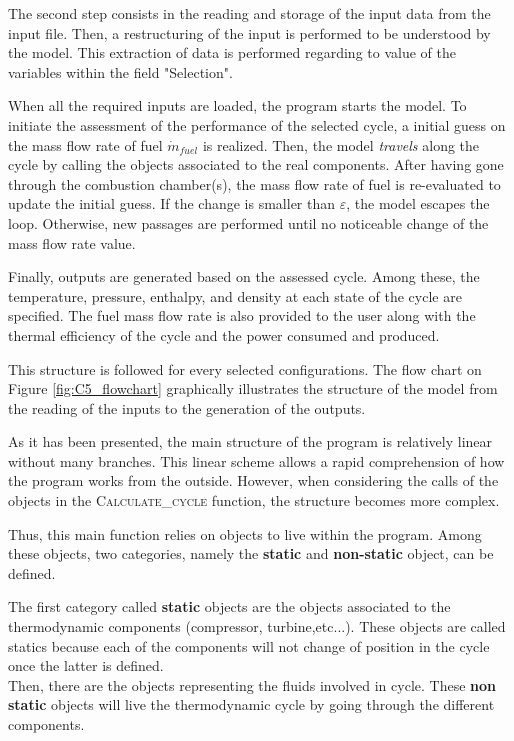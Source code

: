 The second step consists in the reading and storage of the input data from the input file. Then, a restructuring of the input is performed to be understood by the model. This extraction of data is performed regarding to value of the variables within the field "Selection".

When all the required inputs are loaded, the program starts the model. To initiate the assessment of the performance of the selected cycle, a initial guess on the mass flow rate of fuel $\dot{m}_{fuel}$ is realized. Then, the model \textit{travels} along the cycle by calling the objects associated to the real components. 
After having gone through the combustion chamber(s), the mass flow rate of fuel is re-evaluated to update the initial guess. If the change is smaller than $\varepsilon$, the model escapes the loop. Otherwise, new passages are performed until no noticeable change of the mass flow rate value.
   
Finally, outputs are generated based on the assessed cycle. Among these, the temperature, pressure, enthalpy, and density at each state of the cycle are specified. The fuel mass flow rate is also provided to the user along with the thermal efficiency of the cycle and the power consumed and produced. 

This structure is followed for every selected configurations. The flow chart on Figure \ref{fig:C5_flowchart} graphically illustrates the structure of the model from the reading of the inputs to the generation of the outputs.\\ \newpage

As it has been presented, the main structure of the program is relatively linear without many branches. This linear scheme allows a rapid comprehension of how the program works from the outside. However, when considering the calls of the objects in the \textsc{Calculate\_cycle} function, the structure becomes more complex. 

Thus, this main function relies on objects to live within the program.  Among these objects, two categories, namely the \textbf{static} and \textbf{non-static} object, can be defined.

The first category called \textbf{static} objects are the objects associated to the thermodynamic components (compressor, turbine,etc...). These objects are called statics because each of the components will not change of position in the cycle once the latter is defined. \\

Then, there are the objects representing the fluids involved in cycle. These \textbf{non static} objects will live the thermodynamic cycle by going through the different components.

